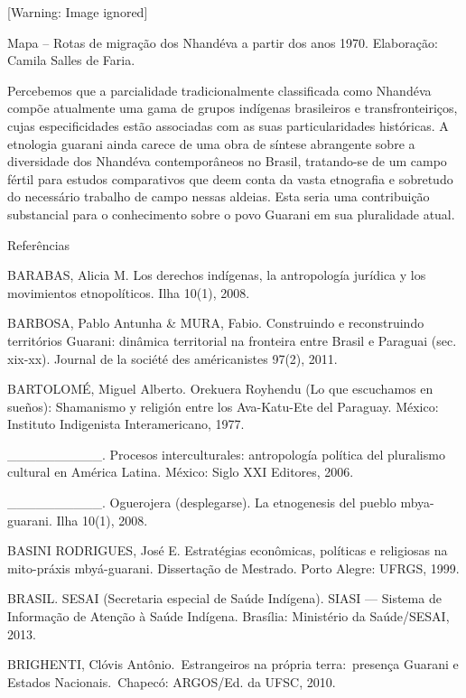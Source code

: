 \documentclass{article}
\newcounter{Mapa}
\renewcommand\theMapa{\arabic{Mapa}}
\begin{document}
  [Warning: Image ignored] %
 

Mapa \stepcounter{Mapa}{\theMapa} {}-- Rotas de migra\c{c}\~ao dos
Nhand\'eva a partir dos anos 1970. Elabora\c{c}\~ao: Camila Salles de
Faria.

Percebemos que a parcialidade tradicionalmente classificada como
Nhand\'eva comp\~oe atualmente uma gama de grupos ind\'igenas
brasileiros e transfronteiri\c{c}os, cujas especificidades est\~ao
associadas com as suas particularidades hist\'oricas. A etnologia
guarani ainda carece de uma obra de s\'intese abrangente sobre a
diversidade dos Nhand\'eva contempor\^aneos no Brasil, tratando-se de
um campo f\'ertil para estudos comparativos que deem conta da vasta
etnografia e sobretudo do necess\'ario trabalho de campo nessas
aldeias. Esta seria uma contribui\c{c}\~ao substancial para o
conhecimento sobre o povo Guarani em sua pluralidade atual. 

Refer\^encias

BARABAS, Alicia M. Los derechos ind\'igenas, la antropolog\'ia
jur\'idica y los movimientos etnopol\'iticos. Ilha 10(1), 2008.

BARBOSA, Pablo Antunha \& MURA, Fabio. Construindo e reconstruindo
territ\'orios Guarani: din\^amica territorial na fronteira entre Brasil
e Paraguai (sec. xix-xx). Journal de la soci\'et\'e des am\'ericanistes
97(2), 2011. 

BARTOLOM\'E, Miguel Alberto. Orekuera Royhendu (Lo que escuchamos en
sue\~nos): Shamanismo y religi\'on entre los Ava-Katu-Ete del Paraguay.
M\'exico: Instituto Indigenista Interamericano, 1977.

\_\_\_\_\_\_\_\_\_\_. Procesos interculturales: antropolog\'ia
pol\'itica del pluralismo cultural en Am\'erica Latina. M\'exico: Siglo
XXI Editores, 2006.

\_\_\_\_\_\_\_\_\_\_. Oguerojera (desplegarse). La etnogenesis del
pueblo mbya-guarani. Ilha 10(1), 2008.

BASINI RODRIGUES, Jos\'e E. Estrat\'egias econ\^omicas, pol\'iticas e
religiosas na mito-pr\'axis mby\'a-guarani. Disserta\c{c}\~ao de
Mestrado. Porto Alegre: UFRGS, 1999.

BRASIL. SESAI (Secretaria especial de Sa\'ude Ind\'igena). SIASI ---
Sistema de Informa\c{c}\~ao de Aten\c{c}\~ao \`a Sa\'ude Ind\'igena.
Bras\'ilia: Minist\'erio da Sa\'ude/SESAI, 2013.

BRIGHENTI, Cl\'ovis Ant\^onio.~Estrangeiros na pr\'opria
terra:~presen\c{c}a Guarani e Estados Nacionais.~Chapec\'o: ARGOS/Ed.
da UFSC, 2010. 
\end{document}

